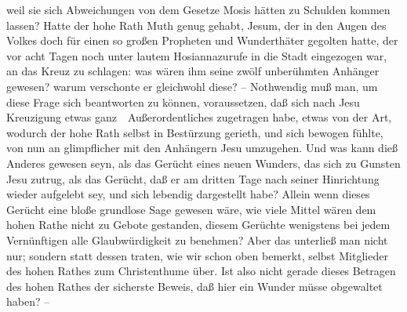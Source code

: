 weil sie sich Abweichungen von dem Gesetze Mosis hätten zu Schulden kommen lassen? Hatte der hohe Rath Muth genug gehabt, Jesum, der in den Augen des Volkes doch für einen so großen Propheten und Wunderthäter gegolten hatte, der vor acht Tagen noch unter lautem Hosiannazurufe in die Stadt eingezogen war, an das Kreuz zu schlagen: was wären ihm seine zwölf unberühmten Anhänger gewesen? warum verschonte er gleichwohl diese? -- Nothwendig muß man, um diese Frage sich beantworten zu können, voraussetzen, daß sich nach Jesu Kreuzigung etwas ganz~\ Außerordentliches zugetragen habe, etwas von der Art, wodurch der hohe Rath selbst in Bestürzung gerieth, und sich bewogen fühlte, von nun an glimpflicher mit den Anhängern Jesu umzugehen. Und was kann dieß Anderes gewesen seyn, als das Gerücht eines neuen Wunders, das sich zu Gunsten Jesu zutrug, als das Gerücht, daß er am dritten Tage nach seiner Hinrichtung wieder aufgelebt sey, und sich lebendig dargestellt habe? Allein wenn dieses Gerücht eine bloße grundlose Sage gewesen wäre, wie viele Mittel wären dem hohen Rathe nicht zu Gebote gestanden, diesem Gerüchte wenigstens bei jedem Vernünftigen alle Glaubwürdigkeit zu benehmen? Aber das unterließ man nicht nur; sondern statt dessen traten, wie wir schon oben bemerkt, selbst Mitglieder des hohen Rathes zum Christenthume über. Ist also nicht gerade dieses Betragen des hohen Rathes der sicherste Beweis, daß hier ein Wunder müsse obgewaltet haben? --\par

